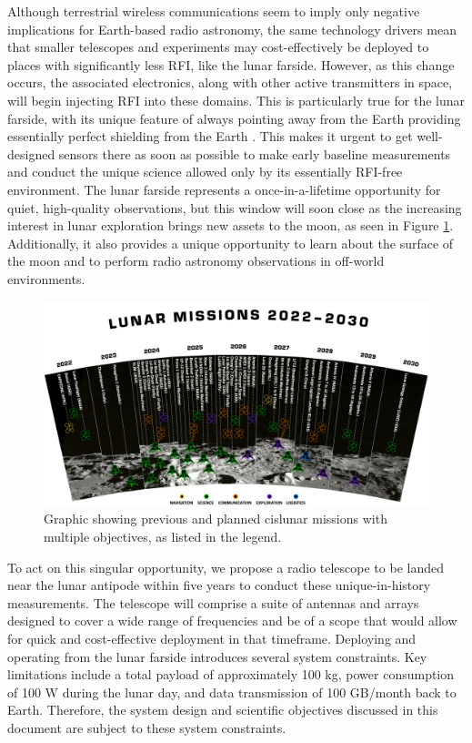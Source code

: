 Although terrestrial wireless communications seem to imply only negative implications for Earth-based radio astronomy, the same technology drivers mean that smaller telescopes and experiments may cost-effectively be deployed to places with significantly less RFI, like the lunar farside. However, as this change occurs, the associated electronics, along with other active transmitters in space, will begin injecting RFI into these domains.  This is particularly true for the lunar farside, with its unique feature of always pointing away from the Earth providing essentially perfect shielding from the Earth \citep{MACCONE2019233,michaud2020lunar,heidmann2002}.
This makes it urgent to get well-designed sensors there as soon as possible to make early baseline measurements and conduct the unique science allowed only by its essentially RFI-free environment. The lunar farside represents a once-in-a-lifetime opportunity for quiet, high-quality observations, but this window will soon close as the increasing interest in lunar exploration brings new assets to the moon, as seen in Figure \ref{fig:missions}. Additionally, it also provides a unique opportunity to learn about the surface of the moon and to perform radio astronomy observations in off-world environments. 

\begin{figure}
    \centering
    \includegraphics[width=\linewidth]{figures/missions.png}
    \caption{Graphic showing previous and planned cislunar missions with multiple objectives, as listed in the legend.    }
    \label{fig:missions}
\end{figure}

To act on this singular opportunity, we propose a radio telescope to be landed near the lunar antipode within five years to conduct these unique-in-history measurements. The telescope will comprise a suite of antennas and arrays designed to cover a wide range of frequencies and be of a scope that would allow for quick and cost-effective deployment in that timeframe.  Deploying and operating from the lunar farside introduces several system constraints. Key limitations include a total payload of approximately 100 kg, power consumption of 100 W during the lunar day, and data transmission of 100 GB/month back to Earth. Therefore, the system design and scientific objectives discussed in this document are subject to these system constraints.

